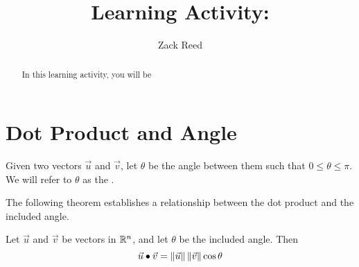 \documentclass{ximera}
\author{Zack Reed}
\title{Learning Activity: }
\begin{document}
\begin{abstract}

    In this learning activity, you will be 
\end{abstract}
\maketitle

\section*{Dot Product and Angle}
 
Given two vectors $\vec{u}$ and $\vec{v}$, let $\theta$ be the angle between them such that $0\leq\theta\leq \pi$.  We will refer to $\theta$ as the .
 
\begin{center}
\end{center}
 
The following theorem establishes a relationship between the dot product and the included angle.
 
  \begin{theorem}\label{th:dotproductcosine} Let $\vec{u}$ and $\vec{v}$ be vectors in $\mathbb{R}^n$, and let $\theta$ be the included angle.  Then
  \begin{equation*} \label{matlintrans}
 \vec{u}\bullet\vec{v}=\left\|\vec{u}\right\|\left\|\vec{v}\right\|\cos \theta
\end{equation*}
\end{theorem}
 
\end{document}
